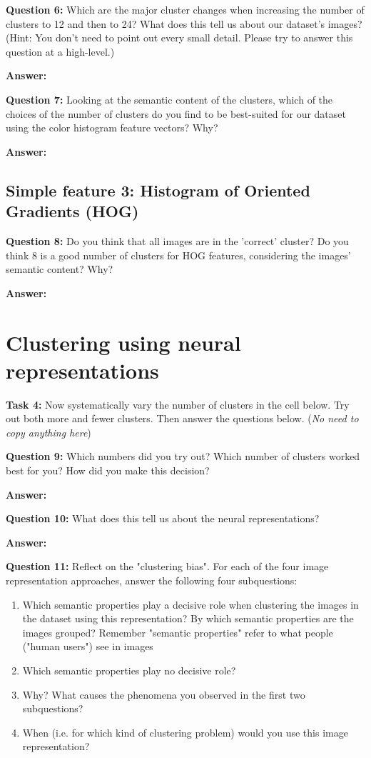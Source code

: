\documentclass[11pt]{article}
\begin{document}
\noindent\textbf{Question 6:} Which are the major cluster changes when increasing the number of clusters to 12 and then to 24? What does this tell us about our dataset's images? (Hint: You don't need to point out every small detail. Please try to answer this question at a high-level.)

\textbf{Answer:}


\noindent\textbf{Question 7:} Looking at the semantic content of the clusters, which of the choices of the number of clusters do you find to be best-suited for our dataset using the color histogram feature vectors? Why?

\textbf{Answer:}


\subsection{Simple feature 3: Histogram of Oriented Gradients (HOG)}

\noindent\textbf{Question 8:} Do you think that all images are in the 'correct' cluster? Do you think 8 is a good number of clusters for HOG features, considering the images' semantic content? Why?

\textbf{Answer:}


\section{Clustering using neural representations}

\textbf{Task 4:} Now systematically vary the number of clusters in the cell below. Try out both more and fewer clusters. Then answer the questions below. (\textit{No need to copy anything here})


\noindent\textbf{Question 9:} Which numbers did you try out? Which number of clusters worked best for you? How did you make this decision?

\textbf{Answer:}


\noindent\textbf{Question 10:} What does this tell us about the neural representations?

\textbf{Answer:}


\noindent\textbf{Question 11:} Reflect on the "clustering bias". For each of the four image representation approaches, answer the following four subquestions:

\begin{enumerate}
\item Which semantic properties play a decisive role when clustering the images in the dataset using this representation? By which semantic properties are the images grouped? Remember "semantic properties" refer to what people ("human users") see in images
\item Which semantic properties play no decisive role?
\item Why? What causes the phenomena you observed in the first two subquestions?
\item When (i.e. for which kind of clustering problem) would you use this image representation?
    
\end{enumerate}
    
\end{document}
